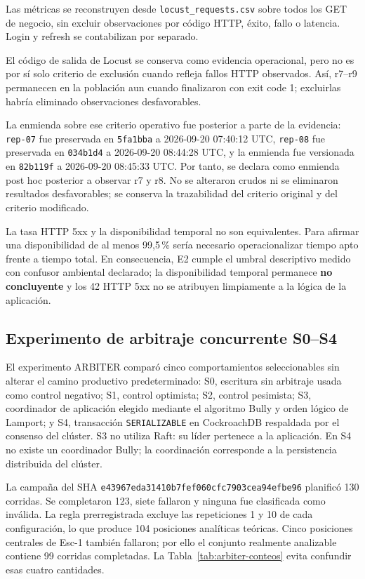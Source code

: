 Las métricas se reconstruyen desde \texttt{locust\_requests.csv} sobre todos
los GET de negocio, sin excluir observaciones por código HTTP, éxito, fallo o
latencia. Login y refresh se contabilizan por separado.

El código de salida de Locust se conserva como evidencia operacional, pero no
es por sí solo criterio de exclusión cuando refleja fallos HTTP observados.
Así, r7--r9 permanecen en la población aun cuando finalizaron con exit code 1;
excluirlas habría eliminado observaciones desfavorables.

La enmienda sobre ese criterio operativo fue posterior a parte de la evidencia:
\texttt{rep-07} fue preservada en \texttt{5fa1bba} a 2026-09-20 07:40:12 UTC,
\texttt{rep-08} fue preservada en \texttt{034b1d4} a 2026-09-20 08:44:28 UTC,
y la enmienda fue versionada en \texttt{82b119f} a 2026-09-20 08:45:33 UTC.
Por tanto, se declara como enmienda post hoc posterior a observar r7 y r8. No
se alteraron crudos ni se eliminaron resultados desfavorables; se conserva la
trazabilidad del criterio original y del criterio modificado.

La tasa HTTP 5xx y la disponibilidad temporal no son equivalentes. Para afirmar
una disponibilidad de al menos 99,5\,\% sería necesario operacionalizar tiempo
apto frente a tiempo total. En consecuencia, E2 cumple el umbral descriptivo
medido con confusor ambiental declarado; la disponibilidad temporal permanece
\textbf{no concluyente} y los 42 HTTP 5xx no se atribuyen limpiamente a la
lógica de la aplicación.

\subsection{Experimento de arbitraje concurrente S0--S4}
\label{subsec:arbiter-resultados}

El experimento ARBITER comparó cinco comportamientos seleccionables sin alterar
el camino productivo predeterminado: S0, escritura sin arbitraje usada como
control negativo; S1, control optimista; S2, control pesimista; S3, coordinador
de aplicación elegido mediante el algoritmo Bully y orden lógico de Lamport; y
S4, transacción \texttt{SERIALIZABLE} en CockroachDB respaldada por el consenso
del clúster. S3 no utiliza Raft: su líder pertenece a la aplicación. En S4 no
existe un coordinador Bully; la coordinación corresponde a la persistencia
distribuida del clúster.

La campaña del SHA
\texttt{e43967eda31410b7fef060cfc7903cea94efbe96} planificó 130 corridas. Se
completaron 123, siete fallaron y ninguna fue clasificada como inválida. La regla
prerregistrada excluye las repeticiones 1 y 10 de cada configuración, lo que
produce 104 posiciones analíticas teóricas. Cinco posiciones centrales de
Esc-1 también fallaron; por ello el conjunto realmente analizable contiene 99
corridas completadas. La Tabla~\ref{tab:arbiter-conteos} evita confundir esas
cuatro cantidades.

